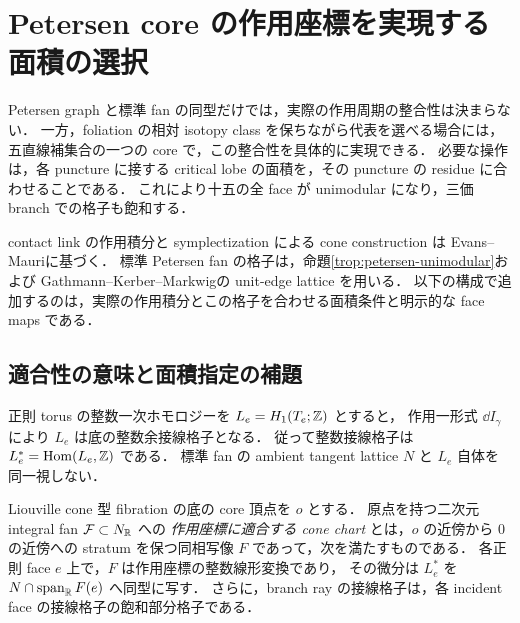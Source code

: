 
\section{Petersen core の作用座標を実現する面積の選択}
\label{per:section}

Petersen graph と標準 fan の同型だけでは，実際の作用周期の整合性は決まらない．
一方，foliation の相対 isotopy class を保ちながら代表を選べる場合には，
五直線補集合の一つの core で，この整合性を具体的に実現できる．
必要な操作は，各 puncture に接する critical lobe の面積を，その puncture の residue に合わせることである．
これにより十五の全 face が unimodular になり，三価 branch での格子も飽和する．

contact link の作用積分と symplectization による cone construction は
Evans--Mauri\cite[Remarks 2.11--2.12, Lemma 2.16]{EM}に基づく．
標準 Petersen fan の格子は，命題\ref{trop:petersen-unimodular}および
Gathmann--Kerber--Markwig\cite[Construction 3.6, Theorem 3.7]{GKM}の unit-edge lattice を用いる．
以下の構成で追加するのは，実際の作用積分とこの格子を合わせる面積条件と明示的な face maps である．

\subsection{適合性の意味と面積指定の補題}

正則 torus の整数一次ホモロジーを $L_e=H_1(T_e;\mathbb Z)$ とすると，
作用一形式 $\dd I_\gamma$ により $L_e$ は底の整数余接線格子となる．
従って整数接線格子は $L_e^*=\operatorname{Hom}(L_e,\mathbb Z)$ である．
標準 fan の ambient tangent lattice $N$ と $L_e$ 自体を同一視しない．

\begin{definition}
\label{per:chart-definition}
Liouville cone 型 fibration の底の core 頂点を $o$ とする．
原点を持つ二次元 integral fan $\mathcal F\subset N_\mathbb R$ への
\emph{作用座標に適合する cone chart} とは，$o$ の近傍から $0$ の近傍への
stratum を保つ同相写像 $F$ であって，次を満たすものである．
各正則 face $e$ 上で，$F$ は作用座標の整数線形変換であり，
その微分は $L_e^*$ を $N\cap\operatorname{span}_\mathbb R F(e)$ へ同型に写す．
さらに，branch ray の接線格子は，各 incident face の接線格子の飽和部分格子である．
\end{definition}

